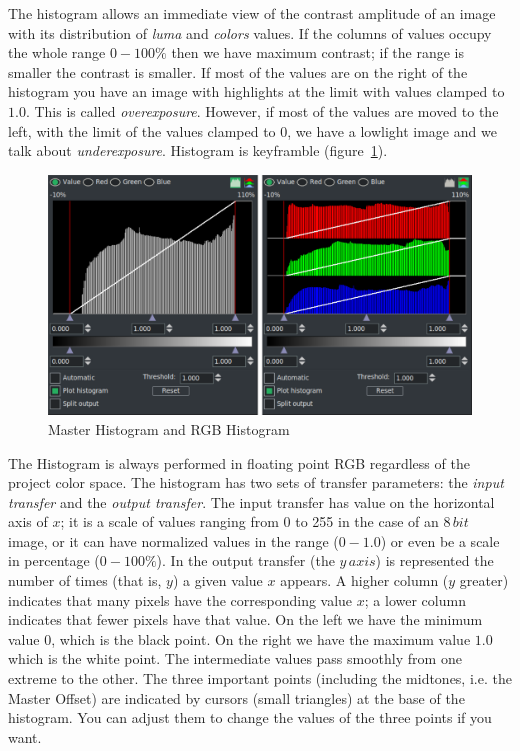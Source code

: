 The histogram allows an immediate view of the contrast amplitude of an image with its distribution of \textit{luma} and \textit{colors} values. If the columns of values occupy the whole range $0-100\%$ then we have maximum contrast; if the range is smaller the contrast is smaller. If most of the values are on the right of the histogram you have an image with highlights at the limit with values clamped to $1.0$. This is called \textit{overexposure}. However, if most of the values are moved to the left, with the limit of the values clamped to $0$, we have a lowlight image and we talk about \textit{underexposure}. Histogram is keyframble (figure~\ref{fig:histogram}).

\begin{figure}[htpb]
    \centering
    \includegraphics[width=0.8\linewidth]{images/histogram.png}
    \caption{Master Histogram and RGB Histogram}
    \label{fig:histogram}
\end{figure} 

The Histogram is always performed in floating point RGB regardless of the project color space. The histogram has two sets of transfer parameters: the \textit{input transfer} and the \textit{output transfer}. The input transfer has value on the horizontal axis of $x$; it is a scale of values ranging from 0 to 255 in the case of an $8\,bit$ image, or it can have normalized values in the range ($0-1.0$) or even be a scale in percentage ($0-100\%$). In the output transfer (the $y\,axis$) is represented the number of times (that is, $y$) a given value $x$ appears. A higher column ($y$ greater) indicates that many pixels have the corresponding value $x$; a lower column indicates that fewer pixels have that value. On the left we have the minimum value $0$, which is the black point. On the right we have the maximum value $1.0$ which is the white point. The intermediate values pass smoothly from one extreme to the other. The three important points (including the midtones, i.e. the Master Offset) are indicated by cursors (small triangles) at the base of the histogram. You can adjust them to change the values of the three points if you want.

